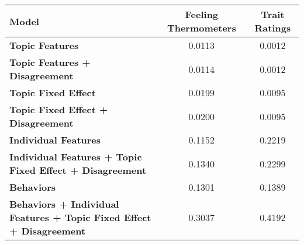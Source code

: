 \begin{tabular}{lcc}
\hline
Model & Feeling Thermometers & Trait Ratings \\
\hline
\textbf{Topic Features} & 0.0113 & 0.0012 \\
\textbf{Topic Features + Disagreement} & 0.0114 & 0.0012 \\
\textbf{Topic Fixed Effect} & 0.0199 & 0.0095 \\
\textbf{Topic Fixed Effect + Disagreement} & 0.0200 & 0.0095 \\
\textbf{Individual Features} & 0.1152 & 0.2219 \\
\textbf{Individual Features + Topic Fixed Effect + Disagreement} & 0.1340 & 0.2299 \\
\textbf{Behaviors} & 0.1301 & 0.1389 \\
\textbf{Behaviors + Individual Features + Topic Fixed Effect + Disagreement} & 0.3037 & 0.4192 \\
\hline
\end{tabular}
